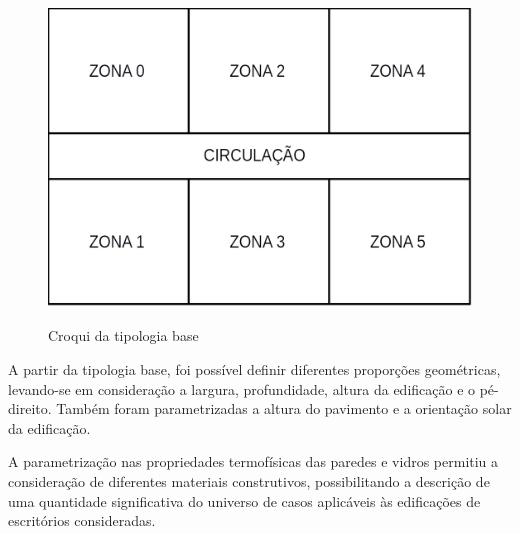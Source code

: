 \documentclass[brazil,hardcopy,openany,a5paper]{ufscthesis}
\begin{document}
		\begin{figure}[h]
			\centering
			\caption{Croqui da tipologia base}
			\includegraphics[width=1\linewidth]{img/croqui.png}
			\label{fig:croqui}
		\end{figure}
		
		
		A partir da tipologia base, foi possível definir diferentes proporções geométricas, levando-se em consideração a largura, profundidade, altura da edificação e o pé-direito. Também foram parametrizadas a altura do pavimento e a orientação solar da edificação.
		
		A parametrização nas propriedades termofísicas das paredes e vidros permitiu a consideração de diferentes materiais construtivos, possibilitando a descrição de uma quantidade significativa do universo de casos aplicáveis às edificações de escritórios consideradas. %
		
\end{document}
